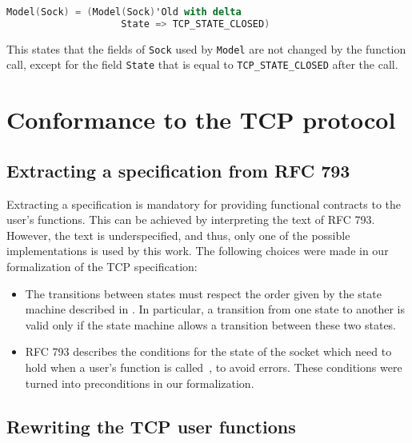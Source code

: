 \documentclass[conference]{IEEEtran}
\def\spark#1{\lstinline[language=Ada]{#1}}
\begin{document}
\begin{lstlisting}[language=Ada, basicstyle=\small\ttfamily]
Model(Sock) = (Model(Sock)'Old with delta
                    State => TCP_STATE_CLOSED)
\end{lstlisting}

\noindent
This states that the fields of \spark{Sock} used by \spark{Model} are not changed by the function call, except for the field \spark{State} that is equal to \spark{TCP_STATE_CLOSED} after the call.

\section{Conformance to the TCP protocol}
\label{sec:verif}



\subsection{Extracting a specification from RFC 793}

Extracting a specification is mandatory for providing functional contracts to the user's functions. This can be achieved by interpreting the text of RFC 793. However, the text is underspecified, and thus, only one of the possible implementations is used by this work. The following choices were made in our formalization of the TCP specification:

\begin{itemize}
\item The transitions between states must respect the order given by the
state machine described in . In particular, a transition from one state to another is valid only if the state machine allows a transition between these two states.
\item RFC 793 describes the conditions for the state of the socket which need to hold when a user's function is called~\cite[p. 52]{rfc793}, to avoid errors. These conditions were turned into preconditions in our formalization.
\end{itemize}

\subsection{Rewriting the TCP user functions}
\end{document}
